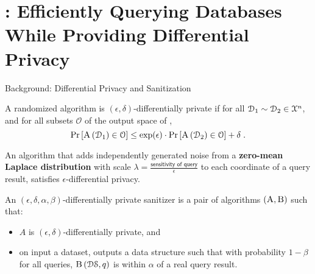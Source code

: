 \section{\epsolute{}: Efficiently Querying Databases While Providing Differential Privacy~\cite{epsolute}}

	\begin{frame}{Background: Differential Privacy and Sanitization}

		\begin{definition}
			\justify%

			A randomized algorithm  is $(\epsilon, \delta)$-differentially private if for all $\mathcal{D}_1 \sim \mathcal{D}_2 \in \mathcal{X}^{n}$, and for all subsets $\mathcal{O}$ of the output space of ,
			\[
				\probability{ \algo{A}{ \database_1 } \in \mathcal{O} } \leq \exp(\epsilon) \cdot \probability{ \algo{A}{ \database_2 } \in \mathcal{O} } + \delta \; .
			\]
		\end{definition}

		\pause%

		\begin{theorem}
			\justify%

			An algorithm  that adds independently generated noise from a \textbf{zero-mean Laplace distribution} with scale $\lambda = \frac{\textsf{sensitivity of query}}{\epsilon}$ to each coordinate of a query result, satisfies $\epsilon$-differential privacy.
		\end{theorem}

		\pause%

		\begin{definition}
			\justify%

			An $(\epsilon, \delta, \alpha, \beta)$-differentially private sanitizer is a pair of algorithms $(\algo{A}, \algo{B})$ such that:
			\begin{itemize}
				\item $A$ is $(\epsilon, \delta)$-differentially private, and
				\item on input a dataset,  outputs a data structure \serverDS{} such that with probability $1 - \beta$ for all queries, $\algo{B}{ \serverDS, \query }$ is within $\alpha$ of a real query result.
			\end{itemize}
		\end{definition}

	\end{frame}

